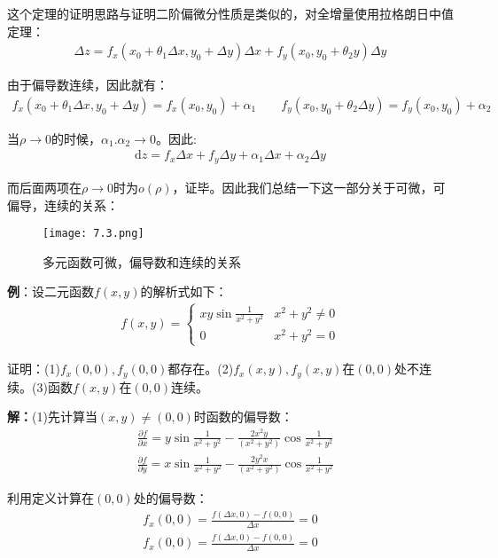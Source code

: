 \documentclass{ctexart}
\let\oldtextbf\textbf %
\renewcommand{\textbf}[1]{\textcolor{btex}{\oldtextbf{#1}}} %
\begin{document}
这个定理的证明思路与证明二阶偏微分性质是类似的，对全增量使用拉格朗日中值定理：
\begin{align*}
\Delta z=f_x(x_0+\theta_1\Delta x,y_0+\Delta y)\Delta x+f_y(x_0,y_0+\theta_2 y)\Delta y    
\end{align*}

由于偏导数连续，因此就有：
\begin{align*}
    f_x(x_0+\theta_1\Delta x,y_0+\Delta y)=f_x(x_0,y_0)+\alpha_1\qquad f_y(x_0,y_0+\theta_2\Delta y)=f_y(x_0,y_0)+\alpha_2
\end{align*}

当$\rho\to 0$的时候，$\alpha_1.\alpha_2\to 0$。因此:
\begin{align*}
    \mathrm{d}z=f_x\Delta x+f_y\Delta y+\alpha_1\Delta x+\alpha_2\Delta y
\end{align*}

而后面两项在$\rho\to 0$时为$o(\rho)$，证毕。因此我们总结一下这一部分关于可微，可偏导，连续的关系：
\begin{figure}[H]    
\centering     
\renewcommand{\figurename}{图}     
\renewcommand{\thefigure}{7.3}    
\begin{myimagebox}[width=0.5\textwidth] %
\texttt{[image: 7.3.png]} %
\end{myimagebox}     
\caption{\label{fig:7.3}多元函数可微，偏导数和连续的关系}   
\end{figure}

\textbf{例}：设二元函数$f(x,y)$的解析式如下：
\begin{align*}
    f(x,y)=\begin{cases}
        xy\sin\frac{1}{x^2+y^2} &x^2+y^2\neq 0\\
        0 &x^2+y^2=0
        \end{cases}
\end{align*}

证明：(1)$f_x(0,0),f_y(0,0)$都存在。(2)$f_x(x,y),f_y(x,y)$在$(0,0)$处不连续。(3)函数$f(x,y)$在$(0,0)$连续。

\textbf{解：}(1)先计算当$(x,y)\neq(0,0)$时函数的偏导数：
\begin{align*}
&\frac{\partial f}{\partial x}=y\sin\frac{1}{x^2+y^2}-\frac{2x^2y}{(x^2+y^2)}\cos\frac{1}{x^2+y^2}\\
& \frac{\partial f}{\partial y}=x\sin\frac{1}{x^2+y^2}-\frac{2y^2x}{(x^2+y^2)}\cos\frac{1}{x^2+y^2}
\end{align*}

利用定义计算在$(0,0)$处的偏导数：
\begin{align*}
    f_x(0,0)=\frac{f(\Delta x,0)-f(0,0)}{\Delta x}=0\\
    f_x(0,0)=\frac{f(\Delta x,0)-f(0,0)}{\Delta x}=0
\end{align*}
\end{document}

